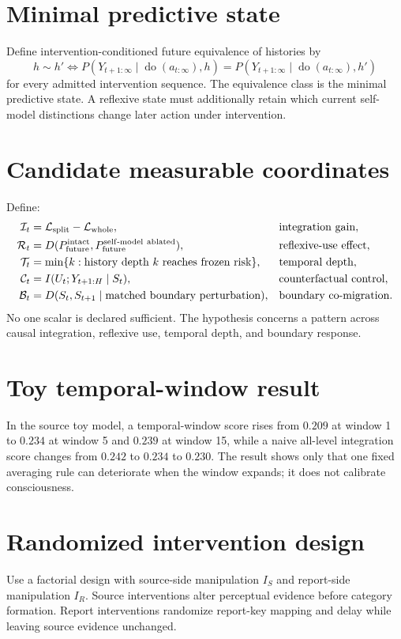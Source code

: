 \documentclass[11pt,a4paper]{article}
\begin{document}
\section{Minimal predictive state}
Define intervention-conditioned future equivalence of histories by
\begin{equation}
h\sim h'\iff
P(Y_{t+1:\infty}\mid\operatorname{do}(a_{t:\infty}),h)
=P(Y_{t+1:\infty}\mid\operatorname{do}(a_{t:\infty}),h')
\end{equation}
for every admitted intervention sequence. The equivalence class is the minimal predictive state. A reflexive state must additionally retain which current self-model distinctions change later action under intervention.

\section{Candidate measurable coordinates}
Define:
\begin{align}
\mathcal I_t&=\mathcal L_{\rm split}-\mathcal L_{\rm whole}, &&\text{integration gain},\\
\mathcal R_t&=D(P_{\rm future}^{\rm intact},P_{\rm future}^{\rm self\text{-}model\ ablated}), &&\text{reflexive-use effect},\\
\mathcal T_t&=\min\{k:\text{history depth }k\text{ reaches frozen risk}\}, &&\text{temporal depth},\\
\mathcal C_t&=I(U_t;Y_{t+1:H}\mid S_t), &&\text{counterfactual control},\\
\mathcal B_t&=D(S_t,S_{t+1}\mid\text{matched boundary perturbation}), &&\text{boundary co-migration}.
\end{align}
No one scalar is declared sufficient. The hypothesis concerns a pattern across causal integration, reflexive use, temporal depth, and boundary response.

\section{Toy temporal-window result}
In the source toy model, a temporal-window score rises from $0.209$ at window 1 to $0.234$ at window 5 and $0.239$ at window 15, while a naive all-level integration score changes from $0.242$ to $0.234$ to $0.230$. The result shows only that one fixed averaging rule can deteriorate when the window expands; it does not calibrate consciousness.

\section{Randomized intervention design}
Use a factorial design with source-side manipulation $I_S$ and report-side manipulation $I_R$. Source interventions alter perceptual evidence before category formation. Report interventions randomize report-key mapping and delay while leaving source evidence unchanged.
\end{document}
